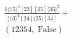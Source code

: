 \documentclass[varwidth, border=5pt]{standalone}
\begin{document}
\begin{my}
$\begin{gathered}
\scriptscriptstyle\frac{1⟨15⟩^2[23][25]⟨35⟩^2}{⟨13⟩^4[24]⟨25⟩[34]}+\\
\scriptscriptstyle(12354,\;\text{False})\phantom{+}
\end{gathered}$
\end{my}
\end{document}
